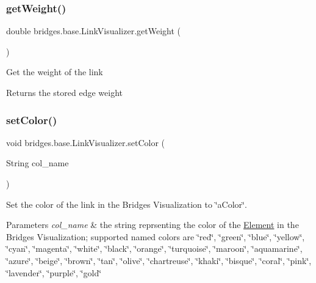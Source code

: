 \subsubsection{\texorpdfstring{getWeight()}{getWeight()}}
{\footnotesize\ttfamily double bridges.\+base.\+Link\+Visualizer.\+get\+Weight (\begin{DoxyParamCaption}{ }\end{DoxyParamCaption})}

Get the weight of the link

\begin{DoxyReturn}{Returns}
the stored edge weight 
\end{DoxyReturn}
\mbox{\label{classbridges_1_1base_1_1_link_visualizer_a92f306dbd73b961befa8ab4c0620a89e}} 
\subsubsection{\texorpdfstring{setColor()}{setColor()}\hspace{0.1cm}{\footnotesize\ttfamily [1/3]}}
{\footnotesize\ttfamily void bridges.\+base.\+Link\+Visualizer.\+set\+Color (\begin{DoxyParamCaption}\item[{String}]{col\+\_\+name }\end{DoxyParamCaption})}

Set the color of the link in the Bridges Visualization to \char`\"{}a\+Color\char`\"{}.


\begin{DoxyParams}{Parameters}
{\em col\+\_\+name} & the string reprsenting the color of the \mbox{\hyperlink{classbridges_1_1base_1_1_element}{Element}} in the Bridges Visualization; supported named colors are \char`\"{}red\char`\"{}, \char`\"{}green\char`\"{}, \char`\"{}blue\char`\"{}, \char`\"{}yellow\char`\"{}, \char`\"{}cyan\char`\"{}, \char`\"{}magenta\char`\"{}, \char`\"{}white\char`\"{}, \char`\"{}black\char`\"{}, \char`\"{}orange\char`\"{}, \char`\"{}turquoise\char`\"{}, \char`\"{}maroon\char`\"{}, \char`\"{}aquamarine\char`\"{}, \char`\"{}azure\char`\"{}, \char`\"{}beige\char`\"{}, \char`\"{}brown\char`\"{}, \char`\"{}tan\char`\"{}, \char`\"{}olive\char`\"{}, \char`\"{}chartreuse\char`\"{}, \char`\"{}khaki\char`\"{}, \char`\"{}bisque\char`\"{}, \char`\"{}coral\char`\"{}, \char`\"{}pink\char`\"{}, \char`\"{}lavender\char`\"{}, \char`\"{}purple\char`\"{}, \char`\"{}gold\char`\"{} \\
\hline
\end{DoxyParams}
\mbox{\label{classbridges_1_1base_1_1_link_visualizer_ab05a7576f99818937276a4937eedeee1}} 

